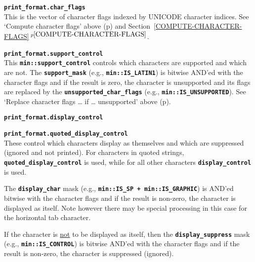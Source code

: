 \documentclass[12pt]{article}
\makeatletter
\newcommand{\TT}[1]{{\tt \bfseries #1}}
\newcommand{\ttmkey}[2]{\TT{#1}\index{#1@{\tt #1}!#2}}
\newcommand{\itemref}[1]{\ref{#1}$\,^{p\pageref{#1}}$}
\newcommand{\pagref}[1]{p\pageref{#1}}
\newcommand{\EOL}{\penalty \exhyphenpenalty}
\newenvironment{itemlist}[1][1.2in]%
	{\begin{list}{}{\setlength{\labelwidth}{#1}%
		        \setlength{\leftmargin}{\labelwidth}%
		        \addtolength{\leftmargin}{+0.2in}%
		        \renewcommand{\makelabel}[1]{##1\hfill}}}%
	{\end{list}}
\makeatother
\begin{document}
\begin{itemlist}[0.6in]

\item[\ttmkey{print\_format.char\_flags}{in {\tt min::printer}}]%
\label{PRINT_FORMAT_CHAR_FLAGS}~\\
This is the vector of character flags indexed by UNICODE character
indices.
See `Compute character flags' above
(\pagref{COMPUTE-CHARACTER-FLAGS})
and Section~\itemref{COMPUTE-CHARACTER-FLAGS}.

\item[\ttmkey{print\_format.support\_control}{in {\tt min::printer}}]%
\label{PRINT_FORMAT_SUPPORT_CONTROL}~\\
\label{SUPPORT-CONTROL}
This \TT{min::support\_control} controls which characters are supported
and which are not.  The \TT{support\_\EOL mask}
(e.g., \TT{min::\EOL IS\_\EOL LATIN1}) is bitwise AND'ed with
the character flags and if the result is zero, the character is unsupported
and its flags are replaced by the
\TT{unsupported\_\EOL char\_\EOL flags}
(e.g., \TT{min::\EOL IS\_\EOL UNSUPPORTED}).
See `Replace character flags \ldots{} if \ldots{} unsupported' above
(\pagref{REPLACE-CHARACTER-FLAGS}).

\item[\ttmkey{print\_format.display\_control}{in {\tt min::printer}}]%
\label{PRINT_FORMAT_DISPLAY_CONTROL}
\item[\ttmkey{print\_format.quoted\_display\_control}{in {\tt min::printer}}]%
\label{PRINT_FORMAT_QUOTED_DISPLAY_CONTROL}\vspace*{-1.5ex}~\\
These control which characters display as
themselves and which are suppressed (ignored and not printed).
For characters in quoted strings, \TT{quoted\_\EOL display\_\EOL control}
is used, while for all other characters \TT{display\_\EOL control} is used.

The \TT{display\_\EOL char} mask
(e.g., \TT{min::\EOL IS\_\EOL SP + min::\EOL IS\_\EOL GRAPHIC})
is AND'ed bitwise with
the character flags and if the result is non-zero,
the character is displayed as itself.  Note however there may
be special processing in this case for the horizontal tab character.

If the character is \underline{not} to be displayed as itself, then
the \TT{display\_\EOL suppress} mask
(e.g., \TT{min::\EOL IS\_\EOL CONTROL})
is bitwise AND'ed with
the character flags and if the result is non-zero,
the character is suppressed (ignored).


\end{itemlist}
\end{document}

